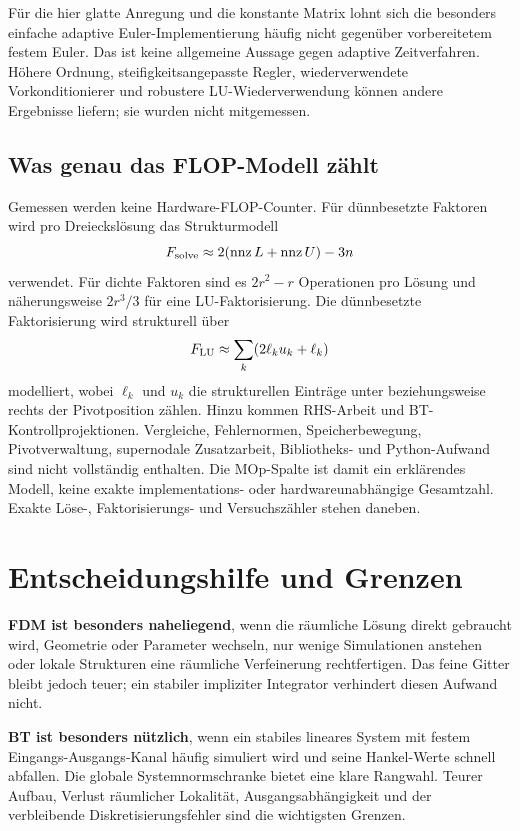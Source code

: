 Für die hier glatte Anregung und die konstante Matrix lohnt sich die besonders einfache adaptive Euler-Implementierung häufig nicht gegenüber vorbereitetem festem Euler. Das ist keine allgemeine Aussage gegen adaptive Zeitverfahren. Höhere Ordnung, steifigkeitsangepasste Regler, wiederverwendete Vorkonditionierer und robustere LU-Wiederverwendung können andere Ergebnisse liefern; sie wurden nicht mitgemessen.

\subsection{Was genau das FLOP-Modell zählt}
Gemessen werden keine Hardware-FLOP-Counter. Für dünnbesetzte Faktoren wird pro Dreieckslösung das Strukturmodell
\begin{equation}
 F_{\rm solve}\approx2(\operatorname{nnz}L+\operatorname{nnz}U)-3n
\end{equation}
verwendet. Für dichte Faktoren sind es $2r^2-r$ Operationen pro Lösung und näherungsweise $2r^3/3$ für eine LU-Faktorisierung. Die dünnbesetzte Faktorisierung wird strukturell über
\begin{equation}
 F_{\rm LU}\approx\sum_k(2\ell_k u_k+\ell_k)
\end{equation}
modelliert, wobei $\ell_k$ und $u_k$ die strukturellen Einträge unter beziehungsweise rechts der Pivotposition zählen. Hinzu kommen RHS-Arbeit und BT-Kontrollprojektionen. Vergleiche, Fehlernormen, Speicherbewegung, Pivotverwaltung, supernodale Zusatzarbeit, Bibliotheks- und Python-Aufwand sind nicht vollständig enthalten. Die MOp-Spalte ist damit ein erklärendes Modell, keine exakte implementations- oder hardwareunabhängige Gesamtzahl. Exakte Löse-, Faktorisierungs- und Versuchszähler stehen daneben.

\section{Entscheidungshilfe und Grenzen}
\textbf{FDM ist besonders naheliegend}, wenn die räumliche Lösung direkt gebraucht wird, Geometrie oder Parameter wechseln, nur wenige Simulationen anstehen oder lokale Strukturen eine räumliche Verfeinerung rechtfertigen. Das feine Gitter bleibt jedoch teuer; ein stabiler impliziter Integrator verhindert diesen Aufwand nicht.

\textbf{BT ist besonders nützlich}, wenn ein stabiles lineares System mit festem Eingangs-Ausgangs-Kanal häufig simuliert wird und seine Hankel-Werte schnell abfallen. Die globale Systemnormschranke bietet eine klare Rangwahl. Teurer Aufbau, Verlust räumlicher Lokalität, Ausgangsabhängigkeit und der verbleibende Diskretisierungsfehler sind die wichtigsten Grenzen.

